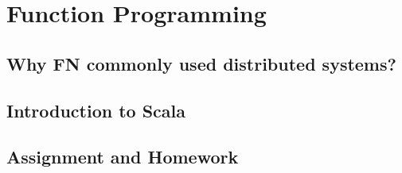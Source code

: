 \section{Function Programming}
\subsection{Why FN commonly used distributed systems?}
\subsection{Introduction to Scala}
\subsection{Assignment and Homework}